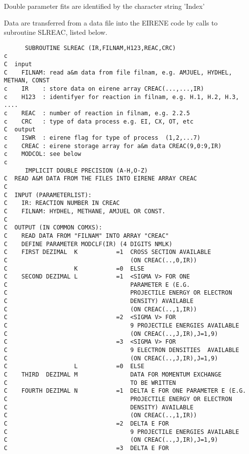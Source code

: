 Double parameter fits are identified by the character string
'Index'

Data are transferred from a data file into the EIRENE code by
calls to subroutine SLREAC, listed below.

\begin{verbatim}
      SUBROUTINE SLREAC (IR,FILNAM,H123,REAC,CRC)
c
C  input
C    FILNAM: read a&m data from file filnam, e.g. AMJUEL, HYDHEL, METHAN, CONST
c    IR    : store data on eirene array CREAC(...,...,IR)
c    H123  : identifyer for reaction in filnam, e.g. H.1, H.2, H.3, ....
c    REAC  : number of reaction in filnam, e.g. 2.2.5
c    CRC   : type of data process e.g. EI, CX, OT, etc
C  output
c    ISWR  : eirene flag for type of process  (1,2,...7)
c    CREAC : eirene storage array for a&m data CREAC(9,0:9,IR)
c    MODCOL: see below
c
      IMPLICIT DOUBLE PRECISION (A-H,O-Z)
C  READ A&M DATA FROM THE FILES INTO EIRENE ARRAY CREAC
C
C  INPUT (PARAMETERLIST):
C    IR: REACTION NUMBER IN CREAC
C    FILNAM: HYDHEL, METHANE, AMJUEL OR CONST.
C
C  OUTPUT (IN COMMON COMXS):
C    READ DATA FROM "FILNAM" INTO ARRAY "CREAC"
C    DEFINE PARAMETER MODCLF(IR) (4 DIGITS NMLK)
C    FIRST DEZIMAL  K           =1  CROSS SECTION AVAILABLE
C                                   (ON CREAC(..,0,IR))
C                   K           =0  ELSE
C    SECOND DEZIMAL L           =1  <SIGMA V> FOR ONE
C                                   PARAMETER E (E.G.
C                                   PROJECTILE ENERGY OR ELECTRON
C                                   DENSITY) AVAILABLE
C                                   (ON CREAC(..,1,IR))
C                               =2  <SIGMA V> FOR
C                                   9 PROJECTILE ENERGIES AVAILABLE
C                                   (ON CREAC(..,J,IR),J=1,9)
C                               =3  <SIGMA V> FOR
C                                   9 ELECTRON DENSITIES  AVAILABLE
C                                   (ON CREAC(..,J,IR),J=1,9)
C                   L           =0  ELSE
C    THIRD  DEZIMAL M               DATA FOR MOMENTUM EXCHANGE
C                                   TO BE WRITTEN
C    FOURTH DEZIMAL N           =1  DELTA E FOR ONE PARAMETER E (E.G.
C                                   PROJECTILE ENERGY OR ELECTRON
C                                   DENSITY) AVAILABLE
C                                   (ON CREAC(..,1,IR))
C                               =2  DELTA E FOR
C                                   9 PROJECTILE ENERGIES AVAILABLE
C                                   (ON CREAC(..,J,IR),J=1,9)
C                               =3  DELTA E FOR

\end{verbatim}

